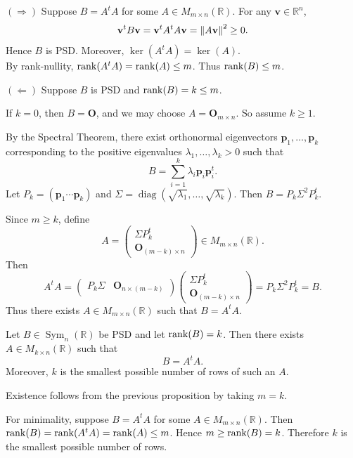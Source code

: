 \begin{pfbox}
$(\Rightarrow)$ Suppose $B=A^tA$ for some $A\in M_{m\times n}(\mathbb{R})$.
For any $\mathbf{v}\in\mathbb{R}^n$,
\[
    \mathbf{v}^tB\mathbf{v}
    =
    \mathbf{v}^tA^tA\mathbf{v}
    =
    \left\lVert A\mathbf{v} \right\rVert^2
    \ge 0.
\]
Hence $B$ is PSD. Moreover, $\ker(A^tA)=\ker(A)$.\\
By rank-nullity, $\operatorname{rank}(A^tA)=\operatorname{rank}(A)\le m$. Thus
$\operatorname{rank}(B)\le m$.

\medskip

$(\Leftarrow)$ Suppose $B$ is PSD and $\operatorname{rank}(B)=k\le m$.

If $k=0$, then $B=\mathbf{O}$, and we may choose $A=\mathbf{O}_{m\times n}$.
So assume $k\ge 1$.

By the Spectral Theorem, there exist orthonormal eigenvectors
$\mathbf{p}_1,\ldots,\mathbf{p}_k$ corresponding to the positive eigenvalues
$\lambda_1,\ldots,\lambda_k>0$ such that
\[
    B
    =
    \sum_{i=1}^k \lambda_i\mathbf{p}_i\mathbf{p}_i^t.
\]
Let $P_k=(\mathbf{p}_1\cdots\mathbf{p}_k)$ and
$\Sigma=\operatorname{diag}(\sqrt{\lambda_1},\ldots,\sqrt{\lambda_k})$. Then
$B=P_k\Sigma^2P_k^t$.

Since $m\ge k$, define
\[
    A
    =
    \left(
    \begin{array}{c}
        \Sigma P_k^t \\
        \hline
        \mathbf{O}_{(m-k)\times n}
    \end{array}
    \right)
    \in M_{m\times n}(\mathbb{R}).
\]
Then
\[
    A^tA
    =
    \left(
    \begin{array}{c|c}
        P_k\Sigma & \mathbf{O}_{n\times (m-k)}
    \end{array}
    \right)
    \left(
    \begin{array}{c}
        \Sigma P_k^t \\
        \hline
        \mathbf{O}_{(m-k)\times n}
    \end{array}
    \right)
    =
    P_k\Sigma^2P_k^t
    =
    B.
\]
Thus there exists $A\in M_{m\times n}(\mathbb{R})$ such that $B=A^tA$.
\end{pfbox}


\begin{corollary}
Let $B\in \operatorname{Sym}_n(\mathbb{R})$ be PSD and let $\operatorname{rank}(B)=k$.
Then there exists $A\in M_{k\times n}(\mathbb{R})$ such that
\[
    B=A^tA.
\]
Moreover, $k$ is the smallest possible number of rows of such an $A$.
\end{corollary}

\begin{pfbox}
Existence follows from the previous proposition by taking $m=k$.

For minimality, suppose $B=A^tA$ for some $A\in M_{m\times n}(\mathbb{R})$.
Then $\operatorname{rank}(B)=\operatorname{rank}(A^tA)=\operatorname{rank}(A)\le m$. Hence $m\ge \operatorname{rank}(B)=k$.
Therefore $k$ is the smallest possible number of rows.
\end{pfbox}


